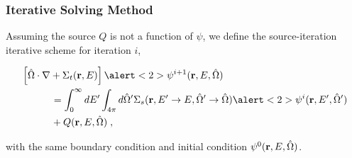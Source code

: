\documentclass[xcolor=x11names, compress]{beamer}
\begin{document}
\begin{frame}
  \frametitle{Iterative Solving Method}
  
  Assuming the source $Q$ is not a function of $\psi$,  we define the
  source-iteration iterative scheme for iteration $i$,

  \begin{align*}
  &\left[ \oh\cdot  \nabla + \Sigma_t(\rvec,E) \right] \alert<2>{\psi^{i+1}}(\rvec,E,\oh)\\
  & \quad \quad \quad= \int_0^{\infty}dE'\int_{4\pi}d\oh'\Sigma_s(\rvec, E'\rightarrow E,\oh'\rightarrow\oh)
    \alert<2>{\psi^{i}}(\rvec,E',\oh') \\ & \quad \quad \quad+ Q(\rvec, E, \oh)\;,
  \end{align*}

  with the same boundary condition and initial condition
  $\psi^0(\mathbf{r}, E, \hat{\Omega})$.

\end{frame}
\end{document}
